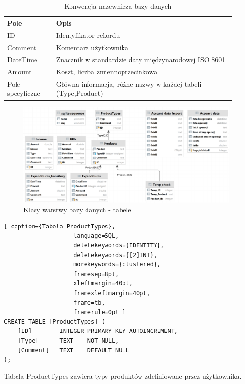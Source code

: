 \documentclass[a4paper,10pt, twoside]{report}
\newcommand{\customstyletable}[1]{\footnotesize{\textbf{#1}}}
\begin{document}
\begin{table}[h]
    \footnotesize
    \begin{tabular}{|p{0.2\linewidth}|p{0.73\linewidth}|}  %
    \hline                  %
    \customstyletable{Pole} & \customstyletable{Opis} \\
    \hline
    {ID} & {Identyfikator rekordu}\\
    \hline
    {Comment} & {Komentarz użytkownika}\\
    \hline
    {DateTime} & {Znacznik w standardzie daty międzynarodowej ISO 8601 \cite{ISO 8601}}\\
    \hline
    {Amount} & {Koszt, liczba zmiennoprzecinkowa}\\
    \hline
    {Pole specyficzne} & {Główna informacja, różne nazwy w każdej tabeli (Type,Product)}\\
    \hline
    \end{tabular}
    \caption{Konwencja nazewnicza bazy danych }
\end{table}

\begin{figure}[H]           %
    \caption{Klasy warstwy bazy danych - tabele}
    \label{fig:Klasy warstwy bazy danych - tabele}
    \centering  
    \includegraphics[width=12cm]{figures/Righten_Finances-db_Tables_DataGrid.png}
\end{figure}


\begin{minipage}{\textwidth}
\begin{lstlisting}[ caption={Tabela ProductTypes},
                    language=SQL,
                    deletekeywords={IDENTITY},
                    deletekeywords={[2]INT},
                    morekeywords={clustered},
                    framesep=8pt,
                    xleftmargin=40pt,
                    framexleftmargin=40pt,
                    frame=tb,
                    framerule=0pt ]
CREATE TABLE [ProductTypes] (
    [ID] 		INTEGER PRIMARY KEY AUTOINCREMENT,
    [Type] 		TEXT 	NOT NULL,
    [Comment] 	TEXT 	DEFAULT NULL
);
\end{lstlisting}
{Tabela ProductTypes zawiera typy produktów zdefiniowane przez użytkownika.}
\end{minipage}
\end{document}
